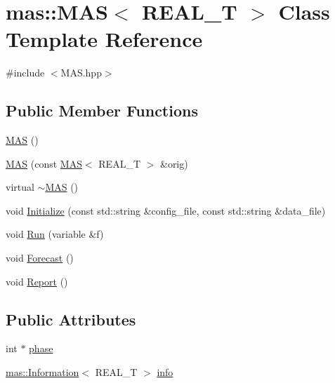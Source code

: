 \hypertarget{classmas_1_1_m_a_s}{\section{mas\-:\-:M\-A\-S$<$ R\-E\-A\-L\-\_\-\-T $>$ Class Template Reference}
\label{classmas_1_1_m_a_s}
}


{\ttfamily \#include $<$M\-A\-S.\-hpp$>$}

\subsection*{Public Member Functions}
\begin{DoxyCompactItemize}
\item 
\hyperlink{classmas_1_1_m_a_s_abf7813e6c16681e7a6c66afacb80cb4f}{M\-A\-S} ()
\item 
\hyperlink{classmas_1_1_m_a_s_ad509033342a4fb5c6916e0d9346c610d}{M\-A\-S} (const \hyperlink{classmas_1_1_m_a_s}{M\-A\-S}$<$ R\-E\-A\-L\-\_\-\-T $>$ \&orig)
\item 
virtual \hyperlink{classmas_1_1_m_a_s_a21f64cb0d2110f201986a7b209a91f40}{$\sim$\-M\-A\-S} ()
\item 
void \hyperlink{classmas_1_1_m_a_s_afe6ea578b33a24f7ae7252a9ed5a595b}{Initialize} (const std\-::string \&config\-\_\-file, const std\-::string \&data\-\_\-file)
\item 
void \hyperlink{classmas_1_1_m_a_s_ad94002bbb3563647a927f5feef150573}{Run} (variable \&f)
\item 
void \hyperlink{classmas_1_1_m_a_s_aac0b9279e39863bea02e9b0eb3c3aa67}{Forecast} ()
\item 
void \hyperlink{classmas_1_1_m_a_s_afd76753b0c33bc0f0dd800c72f23afd5}{Report} ()
\end{DoxyCompactItemize}
\subsection*{Public Attributes}
\begin{DoxyCompactItemize}
\item 
int $\ast$ \hyperlink{classmas_1_1_m_a_s_a26d078a9930af45b319da8e6fdc5ae7d}{phase}
\item 
\hyperlink{classmas_1_1_information}{mas\-::\-Information}$<$ R\-E\-A\-L\-\_\-\-T $>$ \hyperlink{classmas_1_1_m_a_s_adf64a1ceccb1e52a43bc9ebebd87fd45}{info}
\end{DoxyCompactItemize}


